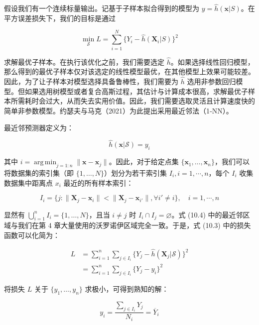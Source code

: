 \documentclass{ctexart}
\DeclareMathOperator*{\argmin}{arg\,min}
\begin{document}
假设我们有一个连续标量输出。记基于子样本拟合得到的模型为 $y=\widehat{h}(\boldsymbol{x}|S)$。在平方误差损失下，我们的目标是通过

\begin{equation*}
\min_{\mathcal{S}}L=\sum_{i=1}^{N}\{Y_i-\widehat{h}(\boldsymbol{X}_i|S)\}^2
\tag{10.3}
\end{equation*}

求解最优子样本。在执行该优化之前，我们需要选定 $\widehat{h}$。如果选择线性回归模型，那么得到的最优子样本仅对该选定的线性模型最优，在其他模型上效果可能较差。因此，为了让子样本对模型选择具备鲁棒性，我们需要为 $\widehat{h}$ 选用非参数回归模型。但如果选用树模型或者复合高斯过程，其估计与计算成本很高，求解最优子样本所需耗时会过大，从而失去实用价值。因此，我们需要选取灵活且计算速度快的简单非参数模型。约瑟夫与马克（2021）为此提出采用最近邻法（1‑NN）。

最近邻预测器定义为：

\begin{equation*}
\widehat{h}(\boldsymbol{x}|\mathcal{S})=y_i
\end{equation*}

其中 $i=\argmin_{j=1:n}\|\boldsymbol{x}-\boldsymbol{x}_j\|$。因此，对于给定点集 $\{\boldsymbol{x}_1,\dots,\boldsymbol{x}_n\}$，我们可以将数据集的索引集（即 $\{1,\dots,N\}$）划分为若干索引集 $I_i,i=1,\cdots,n$，每个 $I_i$ 收集数据集中距离点 $x_i$ 最近的所有样本索引：

\begin{equation*}
I_i=\{j:\|\boldsymbol{X}_j-\boldsymbol{x}_i\|<\|\boldsymbol{X}_j-\boldsymbol{x}_{i'}\|,\forall i'\ne i\},\quad i=1,\cdots,n
\tag{10.4}
\end{equation*}

显然有 $\bigcup_{i=1}^{n}I_i=\{1,\dots,N\}$，且当 $i\ne j$ 时 $I_i\cap I_j=\varnothing$。式 (10.4) 中的最近邻区域与我们在第 4 章大量使用的沃罗诺伊区域完全一致。于是，式 (10.3) 中的损失函数可以化简为：

\begin{align*}
L&=\sum_{i=1}^{n}\sum_{j\in I_i}\{Y_j-\widehat{h}(\boldsymbol{X}_j|\mathcal{S})\}^2\\
&=\sum_{i=1}^{n}\sum_{j\in I_i}\{Y_j-y_i\}^2
\end{align*}

将损失 $L$ 关于 $\{y_1,\dots,y_n\}$ 求极小，可得到熟知的解：

\begin{equation*}
y_i=\frac{\sum_{j\in I_i}Y_j}{N_i}=\overline{Y}_i
\end{equation*}
\end{document}
